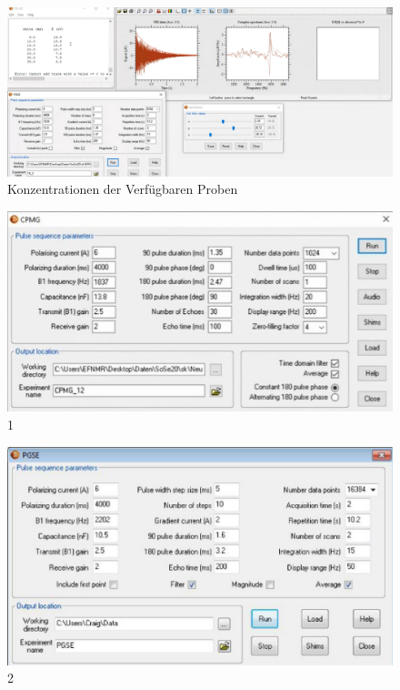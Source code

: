 \begin{figure}[H]
    \includegraphics[width = 0.9 \textwidth]{Screenshot2/16_2.jpg}
    \caption{Konzentrationen der Verfügbaren Proben}
\end{figure}


\begin{figure}[H]
\includegraphics[width = \textwidth]{1.png}
\caption{1}
\label{1}
\end{figure}

\begin{figure}[H]
    \includegraphics[width = \textwidth]{2.png}
    \caption{2}
    \label{2}
    \end{figure}


